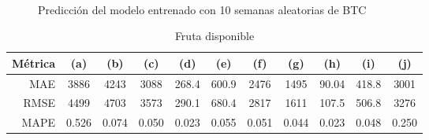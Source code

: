 \documentclass[a4paper,10pt]{article}
\begin{document}
\begin{figure}[h!]
    \\
  \caption{Predicción del modelo entrenado con 10 semanas aleatorias de BTC}
  \label{f:btc_wk_arima}
\end{figure}

\begin{table}[h!]
 \begin{center}
  \begin{tabular}{|r|c|c|c|c|c|c|c|c|c|c|}
    Métrica & (a) & (b) & (c) & (d) & (e) & (f) & (g) & (h) & (i) & (j) \\ \hline
    MAE & 3886 & 4243 & 3088 & 268.4 & 600.9 & 2476 & 1495 & 90.04 & 418.8 & 3001 \\
    RMSE & 4499 & 4703 & 3573 & 290.1 & 680.4 & 2817 & 1611 & 107.5 & 506.8 & 3276 \\
    MAPE & 0.526 & 0.074 & 0.050 & 0.023 & 0.055 & 0.051 & 0.044 & 0.023 & 0.048 & 0.250 \\ \hline
  \end{tabular}
  \caption{Fruta disponible}
  \label{tab:btc}
 \end{center}
\end{table}
\end{document}
